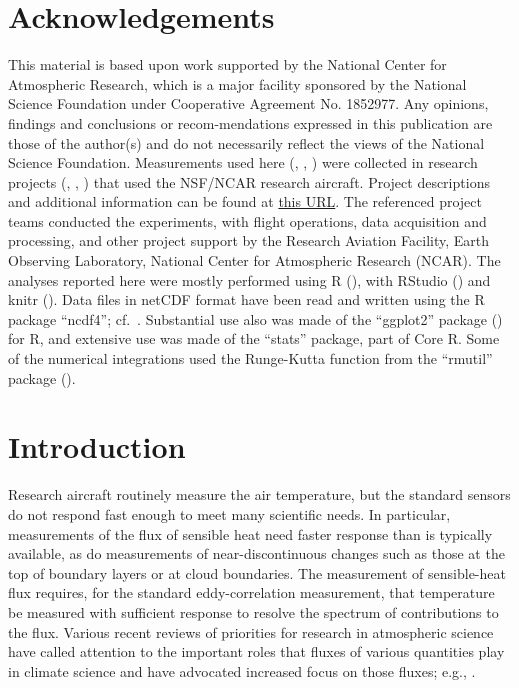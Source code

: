 \documentclass[11pt,twoside,american,12pt,twoside,american]{article}\usepackage[]{graphicx}\usepackage[]{color}
\let\stdsection\section
\renewcommand{\section}{\newpage\stdsection}
\let\OrgIndex\index
\renewcommand*{\index}[1]{\OrgIndex{#1}}
\begin{document}
\clearpage{}

\section*{Acknowledgements}

\label{sec:acknowledgements}

This material is based upon work supported by the National Center
for Atmospheric Research, which is a major facility sponsored by the
National Science Foundation under Cooperative Agreement No. 1852977.
Any opinions, findings and conclusions or recom-mendations expressed
in this publication are those of the author(s) and do not necessarily
reflect the views of the National Science Foundation. Measurements
used here (\citet{VOCALS2011}, \citet{SOCRATES2019}, \citet{WECAN2018})
were collected in research projects (\citet{wood2011vamos}, \citet{albrecht2019cloud},
\citet{mcfarquhar2014southern}) that used the NSF/NCAR research aircraft.
Project descriptions and additional information can be found at \href{https://www.eol.ucar.edu/field_projects/}{this URL}.
The referenced project teams conducted the experiments, with flight
operations, data acquisition and processing, and other project support
by the Research Aviation Facility, Earth Observing Laboratory, National
Center for Atmospheric Research (NCAR). The analyses reported here
were mostly performed using R (\citet{Rlanguage}), with RStudio
(\citet{RStudio2012}) and knitr (\citet{Xie2014a,Xie2014b}).
Data files in netCDF format have been read and written using the R
package ``ncdf4''; cf.~\citet{ncdf4}.
Substantial use also was made of the ``ggplot2''
package (\citet{wickham2009}) for R, and extensive use was made of
the ``stats'' package, part of Core R\@. Some of the numerical
integrations used the Runge-Kutta function from the ``rmutil'' package
(\citet{runge.kutta}).

\thispagestyle{plain}\clearpage{}

\thispagestyle{empty}

\cleardoublepage{}


\section{Introduction}

Research aircraft routinely measure the air temperature, but the standard
sensors do not respond fast enough to meet many scientific needs.
In particular, measurements of the flux of sensible heat need faster
response than is typically available, as do measurements of near-discontinuous
changes such as those at the top of boundary layers or at cloud boundaries.
The measurement of sensible-heat flux requires, for the standard eddy-correlation
measurement, that temperature be measured with sufficient response
to resolve the spectrum of contributions to the flux. Various recent
reviews of priorities for research in atmospheric science have called
attention to the important roles that fluxes of various quantities
play in climate science and have advocated increased focus on those
fluxes; e.g., \citet{NAP6021}.
\end{document}
